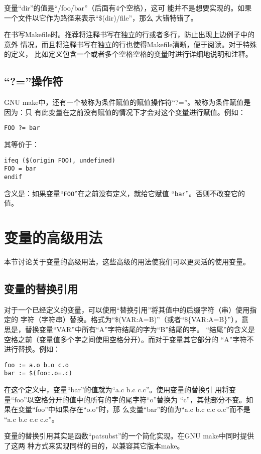 \noindent 变量“dir”的值是“/foo/bar\qquad”（后面有4个空格），这可
能并不是想要实现的。如果一个文件以它作为路径来表示“\$(dir)/file”，那么
大错特错了。

在书写Makefile时。推荐将注释书写在独立的行或者多行，防止出现上边例子中的意外
情况，而且将注释书写在独立的行也使得Makefile清晰，便于阅读。对于特殊的定义，
比如定义包含一个或者多个空格空格的变量时进行详细地说明和注释。

\subsection{“?=”操作符}

GNU make中，还有一个被称为条件赋值的赋值操作符“?=”。被称为条件赋值是因为：只
有此变量在之前没有赋值的情况下才会对这个变量进行赋值。例如：
\begin{Verbatim}[]
FOO ?= bar
\end{Verbatim}
\noindent 其等价于：
\begin{Verbatim}[]
ifeq ($(origin FOO), undefined)
FOO = bar
endif
\end{Verbatim}
\noindent 含义是：如果变量“\verb"FOO"”在之前没有定义，就给它赋值
“\verb"bar"”。否则不改变它的值。


\section{变量的高级用法}
本节讨论关于变量的高级用法，这些高级的用法使我们可以更灵活的使用变量。

\subsection{变量的替换引用}
对于一个已经定义的变量，可以使用“替换引用”将其值中的后缀字符（串）使用指定的
字符（字符串）替换。格式为“\$(VAR:A=B)”（或者“\$\{VAR:A=B\}”），意
思是，替换变量“VAR”中所有“A”字符结尾的字为“B”结尾的字。
“结尾”的含义是空格之前（变量值多个字之间使用空格分开）。而对于变量其它部分的
“A”字符不进行替换。例如：
\begin{Verbatim}[]
foo := a.o b.o c.o
bar := $(foo:.o=.c)
\end{Verbatim}

在这个定义中，变量“bar”的值就为“a.c b.c c.c”。使用变量的替换引
用将变量“foo”以空格分开的值中的所有的字的尾字符“o”替换为
“c”，其他部分不变。如果在变量“foo”中如果存在“o.o”时，那
么变量“bar”的值为“a.c b.c c.c o.c”而不是
“a.c b.c c.c c.c”。

变量的替换引用其实是函数“patsubst”的一个简化实现。在GNU make中同时提供了这两
种方式来实现同样的目的，以兼容其它版本make。

